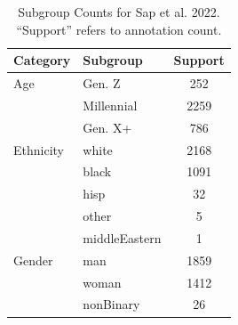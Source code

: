 \documentclass{article} %
\theoremstyle{definition}
\theoremstyle{plain}
\begin{document}
\begin{table}[t]
	\centering
	\begin{tabular}{llc}
		\toprule
		\textbf{Category} & \textbf{Subgroup} & \textbf{Support}\\
		\midrule
		Age& Gen. Z & 252 \\
		& Millennial & 2259 \\
		& Gen. X+ & 786 \\
		\midrule
		Ethnicity & white & 2168 \\
		& black & 1091 \\
		& hisp & 32 \\
		& other & 5 \\
		& middleEastern & 1 \\
		\midrule
		Gender & man & 1859 \\
		& woman & 1412 \\
		& nonBinary & 26 \\
		\bottomrule
	\end{tabular}
		\caption{Subgroup Counts for Sap et al. 2022. ``Support'' refers to annotation count.}
	\label{tab:sap-stats}
\end{table}
\end{document}
